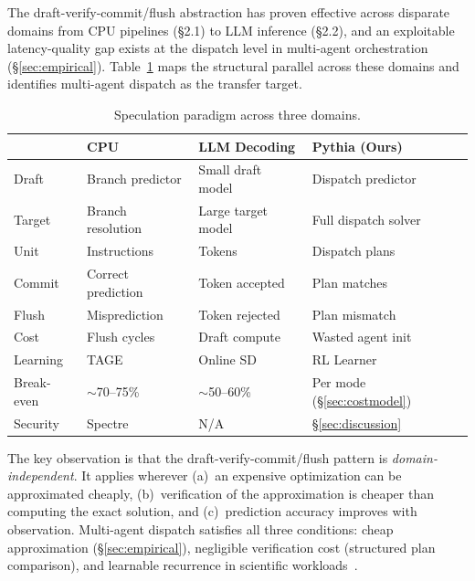 \documentclass[conference,10pt]{IEEEtran}
\begin{document}
The draft-verify-commit/flush abstraction has proven effective across disparate domains from CPU pipelines (\S2.1) to LLM inference (\S2.2), and an exploitable latency-quality gap exists at the dispatch level in multi-agent orchestration (\S\ref{sec:empirical}). Table~\ref{tab:parallel} maps the structural parallel across these domains and identifies multi-agent dispatch as the transfer target.

\begin{table}[t]
\centering
\caption{Speculation paradigm across three domains.}
\label{tab:parallel}
\footnotesize
\setlength{\tabcolsep}{3pt}  %
\begin{tabular}{@{}llll@{}}
\toprule
& \textbf{CPU} & \textbf{LLM Decoding} & \textbf{Pythia (Ours)} \\
\midrule
Draft & Branch predictor & Small draft model & Dispatch predictor \\
Target & Branch resolution & Large target model & Full dispatch solver \\
Unit & Instructions & Tokens & Dispatch plans \\
Commit & Correct prediction & Token accepted & Plan matches \\
Flush & Misprediction & Token rejected & Plan mismatch \\
Cost & Flush cycles & Draft compute & Wasted agent init \\
Learning & TAGE~\cite{seznec2011tage} & Online SD~\cite{liu2024online} & RL Learner \\
Break-even & $\sim$70--75\% & $\sim$50--60\% & Per mode (\S\ref{sec:costmodel}) \\
Security & Spectre~\cite{kocher2019spectre} & N/A & \S\ref{sec:discussion} \\
\bottomrule
\end{tabular}
\end{table}

The key observation is that the draft-verify-commit/flush pattern is \emph{domain-independent}.
It applies wherever (a)~an expensive optimization can be approximated cheaply, (b)~verification of the approximation is cheaper than computing the exact solution, and (c)~prediction accuracy improves with observation.
Multi-agent dispatch satisfies all three conditions: cheap approximation (\S\ref{sec:empirical}), negligible verification cost (structured plan comparison), and learnable recurrence in scientific workloads~\cite{luo2021inferring}.
\end{document}
